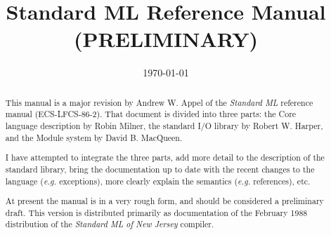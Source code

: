 %
\title{Standard ML Reference Manual (PRELIMINARY)}
\author{}
\date{\today}



\newcommand{\xskip}{\vspace{1ex}}
\newcommand{\res}[1]{{\tt #1}}
\newcommand{\rep}[1]{\underline{\  {\footnotesize #1}  \ }}
\newcommand{\lhs}[1]{\pagebreak[1] \item[#1 \  \( \rightarrow \) ] }
\def\description{\list{}{\labelwidth 1.3in \labelsep 0.3in
                         \leftmargin 1.6in
 \let\makelabel\descriptionlabel}}
\maketitle
\begin{abstract}
This manual is a major revision by Andrew W. Appel
of the {\em Standard ML} reference manual (ECS-LFCS-86-2).  That
document is divided into three parts: the Core language description
by Robin Milner, the standard I/O library by Robert W. Harper,
and the Module system by David B. MacQueen.

I have attempted to integrate the three parts, add more detail to the
description of the standard library, bring the documentation
up to date with the recent changes to the language ({\em e.g.}
exceptions), more clearly explain the semantics ({\em e.g.}
references), etc.

At present the manual is in a very rough form, and should be
considered a preliminary draft.  This version is distributed
primarily as documentation of the February 1988 distribution of the
{\it Standard ML of New Jersey} compiler.
\end{abstract}













\appendix




